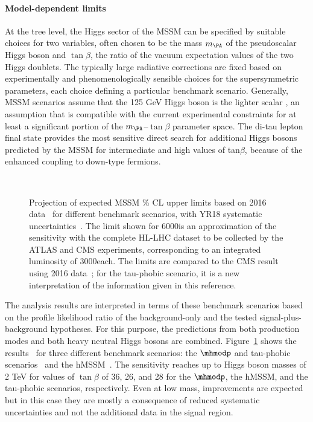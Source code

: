 \paragraph{Model-dependent limits}
\label{sec:model_dep}
%
At the tree level, the Higgs sector of the MSSM can be specified by suitable choices for two variables, 
often chosen to be the mass $m_{\PA}$ of the pseudoscalar Higgs boson
and $\tan\beta$, the ratio of the \mbox{vacuum} expectation
values of the two Higgs doublets.
The typically large radiative corrections are 
fixed based on experimentally and phenomenologically sensible choices for
the supersymmetric parameters, each choice defining a particular benchmark scenario.
Generally, MSSM scenarios assume that the 125 GeV Higgs boson is the lighter scalar \Ph, 
an assumption that is compatible with the current experimental constraints 
for at least a significant portion of the $m_{\PA}$--$\tan\beta$ parameter space.
The di-tau lepton final state provides the most sensitive direct search for additional
Higgs bosons predicted by the MSSM for intermediate and high values of tan$\beta$, 
because of the enhanced
coupling to down-type fermions.
%
\begin{figure}[htbp]
\begin{center}
\\
\end{center}
\caption{Projection of expected MSSM \% CL upper limits based on 2016 data~\cite{HIG-17-020} for different benchmark 
scenarios, with YR18 systematic uncertainties~\cite{CMS-PAS-FTR-18-017}. The limit shown for 6000\fbinv is an approximation of the sensitivity with 
the complete HL-LHC dataset to be collected by the ATLAS and CMS experiments, corresponding to an integrated luminosity of 3000\fbinv each. 
The limits are compared to the CMS result using 2016 data~\cite{HIG-17-020}; for the tau-phobic scenario, 
it is a new interpretation of the information given in this reference. 
}
\label{fig:model_mssm1}
\end{figure}

The analysis results are interpreted in terms of these benchmark scenarios based on the profile likelihood ratio of the 
background-only and the tested signal-plus-background hypotheses. 
For this purpose, the predictions from both production modes and both heavy neutral Higgs bosons are combined.
Figure~\ref{fig:model_mssm1} shows the results~\cite{HIG-17-020} 
for three different benchmark scenarios:
the $\mhmodp$ and tau-phobic scenarios~\cite{Carena:2013ytb} and the hMSSM~\cite{Djouadi:2013uqa,Bagnaschi:2015hka}.
The sensitivity reaches up to Higgs boson masses
of 2 TeV for values of $\tan \beta$ of 36, 26, and 28
for the $\mhmodp$, the hMSSM, and the tau-phobic scenarios,
respectively.
Even at low mass, improvements are expected but in this case they are mostly 
a consequence of reduced systematic uncertainties and not 
the additional data in the signal region.